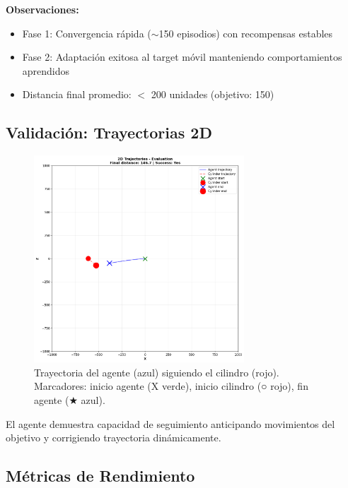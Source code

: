 \documentclass[12pt,a4paper]{article}
\begin{document}
\textbf{Observaciones:}
\begin{itemize}
    \item Fase 1: Convergencia rápida ($\sim$150 episodios) con recompensas estables
    \item Fase 2: Adaptación exitosa al target móvil manteniendo comportamientos aprendidos
    \item Distancia final promedio: $<$ 200 unidades (objetivo: 150)
\end{itemize}

\subsection{Validación: Trayectorias 2D}

\begin{figure}[H]
    \centering
    \includegraphics[width=0.7\textwidth]{logs/evaluation_trajectory.png}
    \caption{Trayectoria del agente (azul) siguiendo el cilindro (rojo). Marcadores: inicio agente (X verde), inicio cilindro (○ rojo), fin agente (★ azul).}
\end{figure}

El agente demuestra capacidad de seguimiento anticipando movimientos del objetivo y corrigiendo trayectoria dinámicamente.

\subsection{Métricas de Rendimiento}
\end{document}
